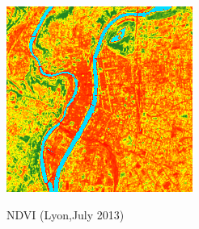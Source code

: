 \documentclass[c]{beamer}
\begin{document}
\begin{frame}
\begin{columns}
\begin{column}{0.25\textwidth}
  \begin{overlayarea}{\linewidth}{1.6cm}
  \centering\vfill
  \includegraphics[scale=0.17]{images/Lyon/07_ndvi.png}
  \end{overlayarea}
  \begin{overlayarea}{\linewidth}{0.5cm}
  \centering
  \tiny NDVI (Lyon,July 2013) \par
  \end{overlayarea}  
 \end{column}

\end{columns}


\end{frame}
\end{document}
